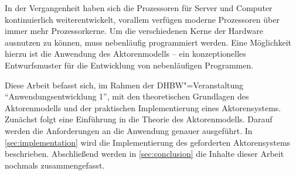 In der Vergangenheit haben sich die Prozessoren für Server und Computer kontinuierlich weiterentwickelt, vorallem verfügen moderne Prozessoren über immer mehr Prozessorkerne.
Um die verschiedenen Kerne der Hardware ausnutzen zu können, muss nebenläufig programmiert werden.
Eine Möglichkeit hierzu ist die Anwendung des Aktorenmodells -- ein konzeptionelles Entwurfsmuster für die Entwicklung von nebenläufigen Programmen.

Diese Arbeit befasst sich, im Rahmen der DHBW"=Veranstaltung \enquote{Anwendungsentwicklung 1}, mit den theoretischen Grundlagen des Aktorenmodells und der praktischen Implementierung eines Aktorensystems.
Zunächst folgt eine Einführung in die Theorie des Aktorenmodells.
Darauf werden die Anforderungen an die Anwendung genauer ausgeführt.
In \autoref{sec:implementation} wird die Implementierung des geforderten Aktorensystems beschrieben.
Abschließend werden in \autoref{sec:conclusion} die Inhalte dieser Arbeit nochmals zusammengefasst.
